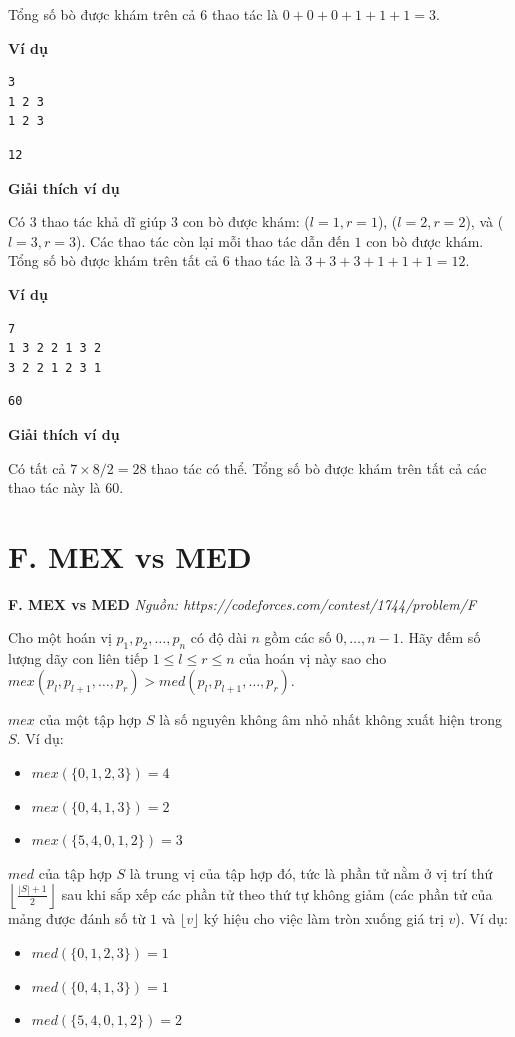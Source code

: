 \documentclass[12pt,a4paper]{article}
\newcommand{\problem}[2]{%
  \begin{mdframed}[
    linecolor=framecolor,
    linewidth=1.5pt,
    backgroundcolor=white,
    topline=true, bottomline=true,
    leftline=true, rightline=true,
    innerleftmargin=10pt, innerrightmargin=10pt,
    innertopmargin=6pt, innerbottommargin=6pt,
  ]
  \textbf{\large #1} \hfill \textit{Nguồn: #2}
  \end{mdframed}
  \vspace{4pt}%
}
\newcommand{\example}{%
  \vspace{6pt}\textbf{\textcolor{sectioncolor}{Ví dụ}}\par\vspace{2pt}%
}
\newcommand{\explanation}{%
  \vspace{6pt}\textbf{\textcolor{sectioncolor}{Giải thích ví dụ}}\par\vspace{2pt}%
}
\begin{document}
Tổng số bò được khám trên cả $6$ thao tác là $0 + 0 + 0 + 1 + 1 + 1 = 3$.

\example

\begin{lstlisting}
3
1 2 3
1 2 3
\end{lstlisting}
\begin{lstlisting}
12
\end{lstlisting}

\explanation
Có $3$ thao tác khả dĩ giúp $3$ con bò được khám: ($l=1, r=1$), ($l=2, r=2$), và ($l=3, r=3$). Các thao tác còn lại mỗi thao tác dẫn đến $1$ con bò được khám. Tổng số bò được khám trên tất cả $6$ thao tác là $3 + 3 + 3 + 1 + 1 + 1 = 12$.

\example

\begin{lstlisting}
7
1 3 2 2 1 3 2
3 2 2 1 2 3 1
\end{lstlisting}
\begin{lstlisting}
60
\end{lstlisting}

\explanation
Có tất cả $7 \times 8 / 2 = 28$ thao tác có thể. Tổng số bò được khám trên tất cả các thao tác này là $60$.


\section{F. MEX vs MED}
\problem{F. MEX vs MED}{https://codeforces.com/contest/1744/problem/F}

Cho một hoán vị $p_1, p_2, \ldots, p_n$ có độ dài $n$ gồm các số $0, \ldots, n - 1$. Hãy đếm số lượng dãy con liên tiếp $1 \le l \le r \le n$ của hoán vị này sao cho $mex(p_l, p_{l+1}, \ldots, p_r) > med(p_l, p_{l+1}, \ldots, p_r)$.

$mex$ của một tập hợp $S$ là số nguyên không âm nhỏ nhất không xuất hiện trong $S$. Ví dụ:
\begin{itemize}
    \item $mex(\{0, 1, 2, 3\}) = 4$
    \item $mex(\{0, 4, 1, 3\}) = 2$
    \item $mex(\{5, 4, 0, 1, 2\}) = 3$
\end{itemize}

$med$ của tập hợp $S$ là trung vị của tập hợp đó, tức là phần tử nằm ở vị trí thứ $\left\lfloor \frac{|S| + 1}{2} \right\rfloor$ sau khi sắp xếp các phần tử theo thứ tự không giảm (các phần tử của mảng được đánh số từ $1$ và $\lfloor v \rfloor$ ký hiệu cho việc làm tròn xuống giá trị $v$). Ví dụ:
\begin{itemize}
    \item $med(\{0, 1, 2, 3\}) = 1$
    \item $med(\{0, 4, 1, 3\}) = 1$
    \item $med(\{5, 4, 0, 1, 2\}) = 2$
\end{itemize}
\end{document}
